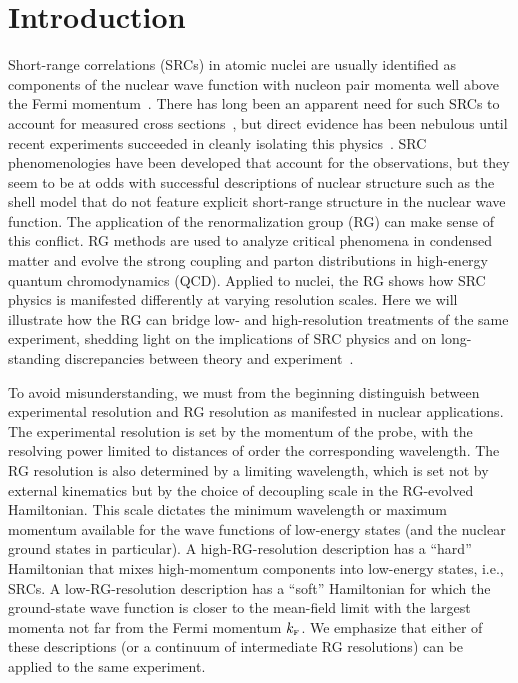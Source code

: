 \documentclass[10pt,aps,prc,floatfix,twocolumn,nofootinbib]{revtex4-1}
\begin{document}
\newpage

\section{Introduction} \label{sec:introduction}

Short-range correlations (SRCs) in atomic nuclei are usually identified as components of the nuclear wave function with nucleon pair momenta well above the Fermi momentum~\cite{Hen:2016kwk}. 
There has long been an apparent need for such SRCs to account for measured cross sections~\cite{Brueckner:1955zzd}, but direct evidence has been nebulous until recent experiments succeeded in cleanly isolating this physics~\cite{Hen:2016kwk,Korover:2014dma,Hen:2014nza,Duer:2018sby,Duer:2018sxh,Schmookler:2019nvf,Cruz-Torres:2020uke,Schmidt:2020kcl,Korover:2020lqf}. 
SRC phenomenologies have been developed that account for the observations, but they seem to be at odds with successful descriptions of nuclear structure such as the shell model that do not feature explicit short-range structure in the nuclear wave function. 
The application of the renormalization group (RG) can make sense of this conflict. 
RG methods are used to analyze critical phenomena in condensed matter and evolve the strong coupling and parton distributions in high-energy quantum chromodynamics (QCD).
Applied to nuclei, the RG shows how SRC physics is manifested differently at varying resolution scales. 
Here we will illustrate how the RG can bridge low- and high-resolution treatments of the same experiment, shedding light on the implications of SRC physics and on long-standing discrepancies between theory and experiment~\cite{Aumann:2020tcq}.

To avoid misunderstanding, we must from the beginning distinguish between experimental resolution and RG resolution as manifested in nuclear applications.
The experimental resolution is set by the momentum of the probe, with the resolving power limited to distances of order the corresponding wavelength.
The RG resolution is also determined by a limiting wavelength, which is set not by external kinematics but by the choice of decoupling scale in the RG-evolved Hamiltonian.
This scale dictates the minimum wavelength or maximum momentum available for the wave functions of low-energy states (and the nuclear ground states in particular).
A high-RG-resolution description has a ``hard'' Hamiltonian that mixes high-momentum components into low-energy states, i.e., SRCs. 
A low-RG-resolution description has a ``soft'' Hamiltonian for which the ground-state wave function is closer to the mean-field limit with the largest momenta not far from the Fermi momentum $k_{\scriptscriptstyle{\text F}}$.
We emphasize that either of these descriptions (or a continuum of intermediate RG resolutions) can be applied to the same experiment.
\end{document}
